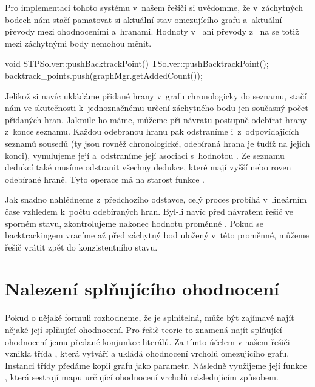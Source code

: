 Pro implementaci tohoto systému v~našem řešiči si uvědomme, že v~záchytných bodech nám stačí pamatovat si aktuální stav omezujícího grafu a~aktuální převody mezi ohodnoceními a~hranami. Hodnoty v~ ani převody z~ na  se totiž mezi záchytnými body nemohou měnit.

\begin{code}
void STPSolver::pushBacktrackPoint() {
	TSolver::pushBacktrackPoint();
	backtrack_points.push(graphMgr.getAddedCount());
}
\end{code}

Jelikož si navíc ukládáme přidané hrany v~grafu chronologicky do seznamu, stačí nám ve skutečnosti k~jednoznačnému určení záchytného bodu jen současný počet přidaných hran. Jakmile ho máme, můžeme při návratu postupně odebírat hrany z~konce seznamu. Každou odebranou hranu pak odstraníme i~z~odpovídajících seznamů sousedů (ty jsou rovněž chronologické, odebíraná hrana je tudíž na jejich konci), vynulujeme její  a~odstraníme její asociaci s~hodnotou . Ze seznamu dedukcí také musíme odstranit všechny dedukce, které mají  vyšší nebo roven odebírané hraně.  Tyto operace má na starost funkce . 

Jak snadno nahlédneme z~předchozího odstavce, celý proces probíhá v~lineárním čase vzhledem k~počtu odebíraných hran. Byl-li navíc před návratem řešič ve sporném stavu, zkontrolujeme nakonec hodnotu proměnné . Pokud se backtrackingem vracíme až před záchytný bod uložený v~této proměnné, můžeme řešič vrátit zpět do konzistentního stavu.

\section{Nalezení splňujícího ohodnocení}

Pokud o nějaké formuli rozhodneme, že je splnitelná, může být zajímavé najít nějaké její splňující ohodnocení. Pro řešič teorie to znamená najít splňující ohodnocení jemu předané konjunkce literálů. Za tímto účelem v našem řešiči vznikla třída , která vytváří a ukládá ohodnocení vrcholů omezujícího grafu. Instanci třídy předáme kopii grafu jako parametr. Následně využijeme její funkce , která sestrojí mapu určující ohodnocení vrcholů následujícím způsobem.

